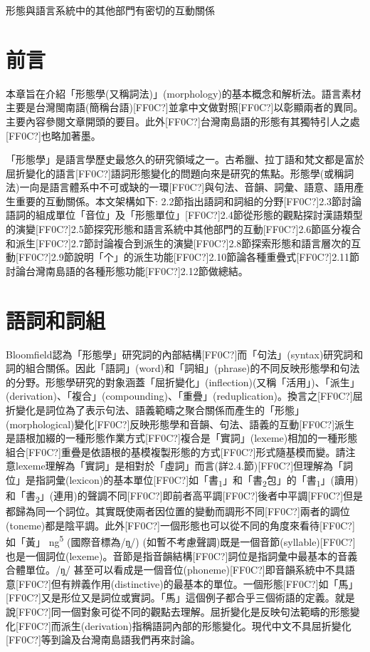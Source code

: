 \rmfamily
形態與語言系統中的其他部門有密切的互動關係

\section{\rmfamily 前言}

\textrm{本章旨在介紹「形態學(又稱詞法)」(morphology)的基本概念和解析法}。\textrm{語言素材主要是台灣閩南語(簡稱台語)}[FF0C?]\textrm{並拿中文做對照[FF0C?]以彰顯兩者的異同}。\textrm{主要內容參閱文章開頭的要目}。\textrm{此外}[FF0C?]\textrm{台灣南島語的形態有其獨特引人之處}[FF0C?]\textrm{也略加著墨。}

\textrm{「形態學」是語言學歷史最悠久的研究領域之一。古希臘、拉丁語和梵文都是富於屈折變化的語言[FF0C?]語詞形態變化的問題向來是研究的焦點。形態學(或稱詞法)一向是語言體系中不可或缺的一環[FF0C?]與句法、音韻、詞彙、語意、語用產生重要的互動關係。本文架構如下: 2.2節指出語詞和詞組的分野[FF0C?]2.3節討論語詞的組成單位「音位」及「形態單位」[FF0C?]2.4節從形態的觀點探討漢語類型的演變[FF0C?]2.5節探究形態和語言系統中其他部門的互動[FF0C?]2.6節區分複合和派生[FF0C?]2.7節討論複合到派生的演變[FF0C?]2.8節探索形態和語言層次的互動[FF0C?]2.9節說明「个」的派生功能[FF0C?]2.10節論各種重疊式[FF0C?]2.11節討論台灣南島語的各種形態功能[FF0C?]2.12節做總結。}

\section{\rmfamily 語詞和詞組}

\textrm{Bloomfield認為「形態學」研究詞的內部結構[FF0C?]而「句法」(syntax)研究詞和詞的組合關係。因此「語詞」(word)和「詞組」(phrase)的不同反映形態學和句法的分野。形態學研究的對象涵蓋「屈折變化」(inflection)(又稱「活用」)、「派生」(derivation)、「複合」(compounding)、「重疊」(reduplication)。換言之[FF0C?]屈折變化是詞位為了表示句法、語義範疇之聚合關係而產生的「形態」(morphological)變化[FF0C?]反映形態學和音韻、句法、語義的互動[FF0C?]派生是語根加綴的一種形態作業方式[FF0C?]複合是「實詞」(lexeme)相加的一種形態組合[FF0C?]重疊是依語根的基模複製形態的方式[FF0C?]形式隨基模而變。請注意lexeme理解為「實詞」是相對於「虛詞」而言(詳2.4.節)[FF0C?]但理解為「詞位」是指詞彙(lexicon)的基本單位[FF0C?]如「書}\textrm{\textsubscript{1}}\textrm{」和「書}\textrm{\textsubscript{2}}\textrm{包」的「書}\textrm{\textsubscript{1}}\textrm{」(讀用)和「書}\textrm{\textsubscript{2}}\textrm{」(連用)的聲調不同[FF0C?]即前者高平調[FF0C?]後者中平調[FF0C?]但是都歸為同一个詞位。其實既使兩者因位置的變動而調形不同[FF0C?]兩者的調位(toneme)都是陰平調。此外[FF0C?]一個形態也可以從不同的角度來看待[FF0C?]如「黃」 ng}\textrm{\textsuperscript{5}} \textrm{(國際音標為/ŋ̩/) (如暫不考慮聲調)既是一個音節(syllable)[FF0C?]也是一個詞位(lexeme)}。\textrm{音節是指音韻結構}[FF0C?]\textrm{詞位是指詞彙中最基本的音義合體單位}。\textrm{/ŋ̩/ 甚至可以看成是一個音位(phoneme)}[FF0C?]\textrm{即音韻系統中不具語意}[FF0C?]\textrm{但有辨義作用(distinctive)的最基本的單位}。\textrm{一個形態[FF0C?]如「馬」}[FF0C?]\textrm{又是形位又是詞位或實詞}。\textrm{「馬」這個例子都合乎三個術語的定義}。\textrm{就是說}[FF0C?]\textrm{同一個對象可從不同的觀點去理解}。\textrm{屈折變化是反映句法範疇的形態變化}[FF0C?]\textrm{而派生(derivation)指稱語詞內部的形態變化}。\textrm{現代中文不具屈折變化}[FF0C?]\textrm{等到論及台灣南島語我們再來討論}。

